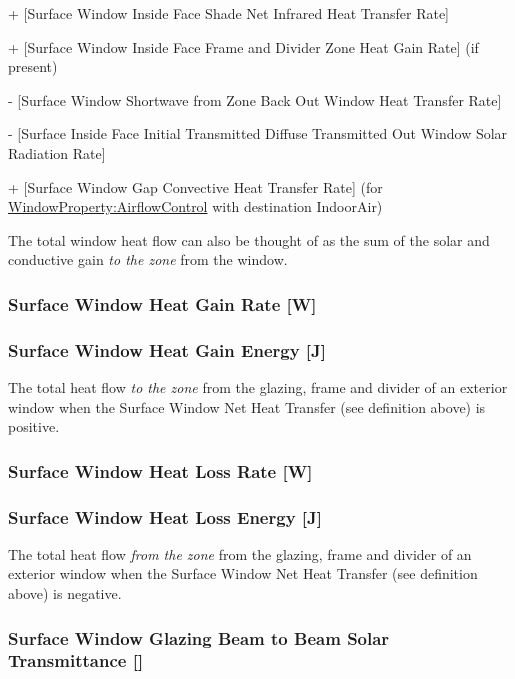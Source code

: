   + {[}Surface Window Inside Face Shade Net Infrared Heat Transfer Rate{]}

  + {[}Surface Window Inside Face Frame and Divider Zone Heat Gain Rate{]} (if present)

  - {[}Surface Window Shortwave from Zone Back Out Window Heat Transfer Rate{]}

  - {[}Surface Inside Face Initial Transmitted Diffuse Transmitted Out Window Solar Radiation Rate{]}

  + {[Surface Window Gap Convective Heat Transfer Rate] (for \hyperref[windowpropertyairflowcontrol]{WindowProperty:AirflowControl} with destination IndoorAir)}

The total window heat flow can also be thought of as the sum of the solar and conductive gain \emph{to the zone} from the window.

\subsubsection{Surface Window Heat Gain Rate {[}W{]}}\label{surface-window-heat-gain-rate-w}

\subsubsection{Surface Window Heat Gain Energy {[}J{]}}\label{surface-window-heat-gain-energy-j}

The total heat flow \emph{to the zone} from the glazing, frame and divider of an exterior window when the Surface Window Net Heat Transfer (see definition above) is positive.

\subsubsection{Surface Window Heat Loss Rate {[}W{]}}\label{surface-window-heat-loss-rate-w}

\subsubsection{Surface Window Heat Loss Energy {[}J{]}}\label{surface-window-heat-loss-energy-j}

The total heat flow \emph{from the zone} from the glazing, frame and divider of an exterior window when the Surface Window Net Heat Transfer (see definition above) is negative.

\subsubsection{Surface Window Glazing Beam to Beam Solar Transmittance {[]}}\label{surface-window-glazing-beam-to-beam-solar-transmittance}

